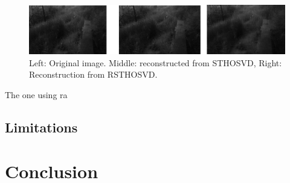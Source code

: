 \documentclass[preprint]{elsarticle}
\begin{document}
\begin{figure}[h!]
    \centering
    \includegraphics[width=\textwidth]{figs/osr.png}
    \caption{Left: Original image. Middle: reconstructed from STHOSVD, Right: Reconstruction from RSTHOSVD.}
    \label{fig:my_label}
\end{figure}

The one using ra

\subsection{Limitations}

\section{Conclusion}


\end{document}
